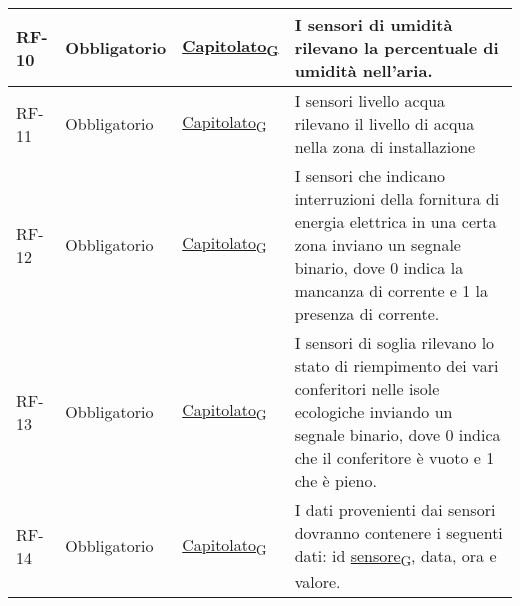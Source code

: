 \begin{longtable}{|>{\centering\arraybackslash}m{}|>{\centering\arraybackslash}m{}|>{\centering\arraybackslash}m{}|>{\centering\arraybackslash}m{}|}
	RF-10           & Obbligatorio        & \href{https://7last.github.io/docs/rtb/documentazione-interna/glossario\#capitolato}{Capitolato\textsubscript{G}}     & I sensori di umidità rilevano la percentuale di umidità nell’aria.                                                                                                                                                                                                                                                 \\\hline
	RF-11           & Obbligatorio        & \href{https://7last.github.io/docs/rtb/documentazione-interna/glossario\#capitolato}{Capitolato\textsubscript{G}}     & I sensori livello acqua rilevano il livello di acqua nella zona di installazione                                                                                                                                                                                                                                   \\\hline
	RF-12           & Obbligatorio        & \href{https://7last.github.io/docs/rtb/documentazione-interna/glossario\#capitolato}{Capitolato\textsubscript{G}}     & I sensori che indicano interruzioni della fornitura di energia elettrica in una certa zona inviano un segnale binario, dove 0 indica la mancanza di corrente e 1 la presenza di corrente.                                                                                                                          \\\hline
	RF-13           & Obbligatorio        & \href{https://7last.github.io/docs/rtb/documentazione-interna/glossario\#capitolato}{Capitolato\textsubscript{G}}     & I sensori di soglia rilevano lo stato di riempimento dei vari conferitori nelle isole ecologiche inviando un segnale binario, dove 0 indica che il conferitore è vuoto e 1 che è pieno.                                                                                                                            \\\hline
	RF-14           & Obbligatorio        & \href{https://7last.github.io/docs/rtb/documentazione-interna/glossario\#capitolato}{Capitolato\textsubscript{G}}     & I dati provenienti dai sensori dovranno contenere i seguenti dati: id \href{https://7last.github.io/docs/rtb/documentazione-interna/glossario\#sensore}{sensore\textsubscript{G}}, data, ora e valore.                                                                                                                                                                                                                 \\\hline

\end{longtable}
